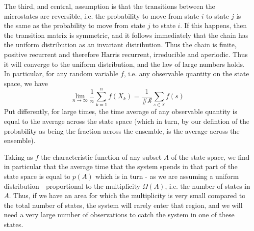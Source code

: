 \documentclass[a4paper, draft]{article}
\theoremstyle{own}
\theoremstyle{remark}
\begin{document}
The third, and central, assumption is that the transitions between the microstates are reversible, i.e. the probability to move from state $i$ to state $j$ is the same as the probability to move from state $j$ to state $i$. If this happens, then the transition matrix is symmetric, and it follows immediately that the chain has the uniform distribution as an invariant distribution. Thus the chain is finite, positive recurrent and therefore Harris recurrent, irreducible and aperiodic. Thus it will converge to the uniform distribution, and the law of large numbers holds. In particular, for any random variable $f$, i.e. any observable quantity on the state space, we have 
$$
\lim_{n \rightarrow \infty} \frac{1}{n} \sum_{k=1}^n f(X_k) = 
\frac{1}{\#{\mathcal S}} \sum_{s \in {\mathcal S}} f(s)
$$
Put differently, for large times, the time average of any observable quantity is equal to the average across the state space (which in turn, by our defintion of the probability as being the fraction across the ensemble, is the average across the ensemble).

Taking as $f$ the characteristic function of any subset $A$ of the state space, we find in particular that the average time that the system spends in that part of the state space is equal to $p(A)$ which is in turn - as we are assuming a uniform distribution - proportional to the multiplicity $\Omega(A)$, i.e. the number of states in $A$. Thus, if we have an area for which the multiplicity is very small compared to the total number of states, the system will rarely enter that region, and we will need a very large number of observations to catch the system in one of these states.
\end{document}
